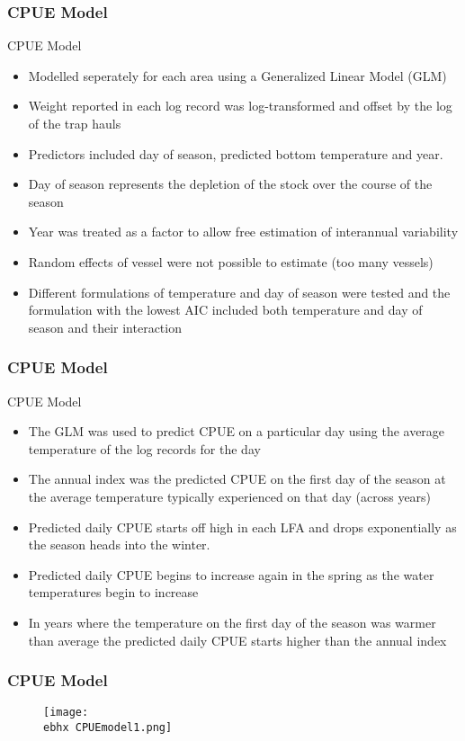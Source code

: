 \documentclass{beamer}
\newcommand{\ebhx}{\string~/bio.data/bio.lobster/figures/LFA3438Framework2019/figures/Brad/} %
\begin{document}
\begin{frame}
\frametitle{CPUE Model}
CPUE Model
\begin{itemize}
\item Modelled seperately for each area using a Generalized Linear Model (GLM)
\item Weight reported in each log record was log-transformed and offset by the log of the trap hauls
\item Predictors included day of season, predicted bottom temperature and year.
\item Day of season represents the depletion of the stock over the course of the season
\item Year was treated as a factor to allow free estimation of interannual variability
\item Random effects of vessel were not possible to estimate (too many vessels)
\item Different formulations of temperature and day of season were tested and the formulation with the lowest AIC included both temperature and day of season and their interaction 
\end{itemize}
\end{frame}



\begin{frame}
\frametitle{CPUE Model}
CPUE Model
\begin{itemize}
\item The GLM was used to predict CPUE on a particular day using the average temperature of the log records for the day
\item The annual index was the predicted CPUE on the first day of the season at the average temperature typically experienced on that day (across years)
\item Predicted daily CPUE starts off high in each LFA and drops exponentially as the season heads into the winter.
\item Predicted daily CPUE begins to increase again in the spring as the water temperatures begin to increase
\item In years where the temperature on the first day of the season was warmer than average the predicted daily CPUE starts higher than the annual index
\end{itemize}
\end{frame}




\begin{frame}
\frametitle{CPUE Model}
\begin{figure}
        \begin{center}
            \texttt{[image: \\ebhx CPUEmodel1.png]}
        \end{center}
    \end{figure}
\end{frame}
\end{document}

